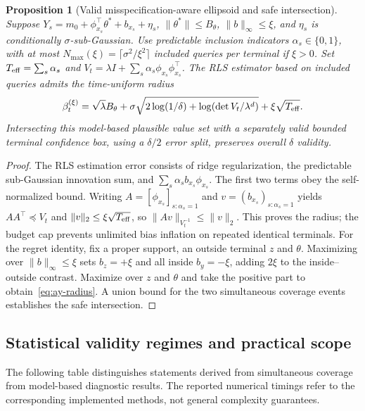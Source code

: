 \documentclass{article}
\theoremstyle{plain}
\newtheorem{proposition}[theorem]{Proposition}
\theoremstyle{definition}
\begin{document}
\begin{proposition}[Valid misspecification-aware ellipsoid and safe intersection]
\label{thm:t3-misspec}
Suppose $Y_s=m_0+\phi_{x_s}^\top\theta^*+b_{x_s}+\eta_s$,
$\|\theta^*\|\le B_\theta$, $\|b\|_\infty\le\xi$,
and $\eta_s$ is conditionally $\sigma$-sub-Gaussian. Use predictable
inclusion indicators $\alpha_s\in\{0,1\}$, with at most
$N_{\max}(\xi)=\lceil\sigma^2/\xi^2\rceil$ included queries per
terminal if $\xi>0$. Set $T_{\rm eff}=\sum_s\alpha_s$ and
$V_t=\lambda I+\sum_s\alpha_s\phi_{x_s}\phi_{x_s}^\top$.
The RLS estimator based on included queries admits the time-uniform
radius
\begin{equation}
\beta_t^{(\xi)}=\sqrt\lambda B_\theta+
\sigma\sqrt{2\log(1/\delta)+\log(\det V_t/\lambda^d)}
+\xi\sqrt{T_{\rm eff}}.
\label{eq:t3-misspec-radius}
\end{equation}
Intersecting this model-based plausible value set with a
separately valid bounded terminal confidence box, using a
$\delta/2$ error split, preserves overall $\delta$ validity.
\end{proposition}
\begin{proof}
The RLS estimation error consists of ridge regularization, the
predictable sub-Gaussian innovation sum, and
$\sum_s\alpha_sb_{x_s}\phi_{x_s}$.
The first two terms obey the self-normalized bound. Writing
$A=[\phi_{x_s}]_{s:\alpha_s=1}$ and
$v=(b_{x_s})_{s:\alpha_s=1}$ yields
$AA^\top\preceq V_t$ and $\|v\|_2\le\xi\sqrt{T_{\rm eff}}$,
so $\|Av\|_{V_t^{-1}}\le\|v\|_2$.
This proves the radius; the budget cap prevents unlimited bias
inflation on repeated identical terminals. For the regret identity,
fix a proper support, an outside terminal $z$ and $\theta$.
Maximizing over $\|b\|_\infty\le\xi$ sets $b_z=+\xi$
and all inside $b_y=-\xi$, adding $2\xi$ to the inside--outside
contrast. Maximize over $z$ and $\theta$ and take the positive part
to obtain~\eqref{eq:ay-radius}. A union bound for the two
simultaneous coverage events establishes the safe intersection.
\end{proof}

\subsection{Statistical validity regimes and practical scope}
\label{app:validity-regimes}
The following table distinguishes statements derived from simultaneous coverage from model-based diagnostic results. The reported numerical timings refer to the corresponding implemented methods, not general complexity guarantees.
\end{document}

